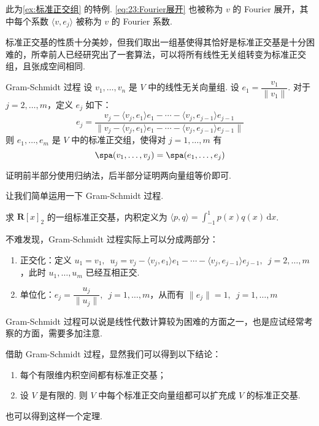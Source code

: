 此为\autoref{ex:标准正交组} 的特例. \autoref{eq:23:Fourier展开} 也被称为 $ v $ 的 Fourier 展开，其中每个系数 $ \langle v, e_j \rangle $ 被称为 $ v $ 的 Fourier 系数.

标准正交基的性质十分美妙，但我们取出一组基使得其恰好是标准正交基是十分困难的，所幸前人已经研究出了一套算法，可以将所有线性无关组转变为标准正交组，且张成空间相同.

\begin{theorem}{Gram-Schmidt 过程}{} 
    设 $v_1, \ldots ,v_n$ 是 $ V $ 中的线性无关向量组. 设 $e_1 = \dfrac{v_1}{\lVert v_1 \rVert}$. 对于 $ j = 2, \ldots , m$，定义 $ e_j $ 如下：
    \[ e_j = \frac{v_j - \langle v_j, e_1 \rangle e_1 - \cdots - \langle v_j, e_{j - 1} \rangle e_{j - 1} }{\lVert v_j - \langle v_j, e_1 \rangle e_1 - \cdots - \langle v_j, e_{j - 1} \rangle e_{j - 1} \rVert}\]
    则 $e_1, \ldots , e_m $ 是 $ V $ 中的标准正交组，使得对 $ j = 1, \ldots , m $ 有
    \[ \spa(v_1, \ldots, v_j) = \spa(e_1, \ldots, e_j) \]
\end{theorem}

证明前半部分使用归纳法，后半部分证明两向量组等价即可.

让我们简单运用一下 Gram-Schmidt 过程.
\begin{example}{}{}
    求 $\mathbf{R}[x]_2$ 的一组标准正交基，内积定义为 $\langle p, q \rangle = \displaystyle\int_{-1}^1 p(x)q(x)\,\mathrm{d}x$.
\end{example}

不难发现，Gram-Schmidt 过程实际上可以分成两部分：
\begin{enumerate}
    \item 正交化：定义 $ u_1 = v_1 , \enspace u_j = v_j - \langle v_j, e_1 \rangle e_1 - \cdots - \langle v_j, e_{j - 1} \rangle e_{j - 1}, \enspace j = 2, \ldots , m$，此时 $u_1, \ldots , u_m$ 已经互相正交.

    \item 单位化：$ e_j = \dfrac{u_j}{\lVert u_j \rVert} , \enspace j = 1, \ldots , m$，从而有 $\lVert e_j \rVert = 1, \enspace j = 1, \ldots , m$
\end{enumerate}

Gram-Schmidt 过程可以说是线性代数计算较为困难的方面之一，也是应试经常考察的方面，需要多加注意.

借助 Gram-Schmidt 过程，显然我们可以得到以下结论：
\begin{enumerate}
    \item 每个有限维内积空间都有标准正交基；

    \item 设 $ V $ 是有限的. 则 $ V $ 中每个标准正交向量组都可以扩充成 $ V $ 的标准正交基.
\end{enumerate}
也可以得到这样一个定理.

